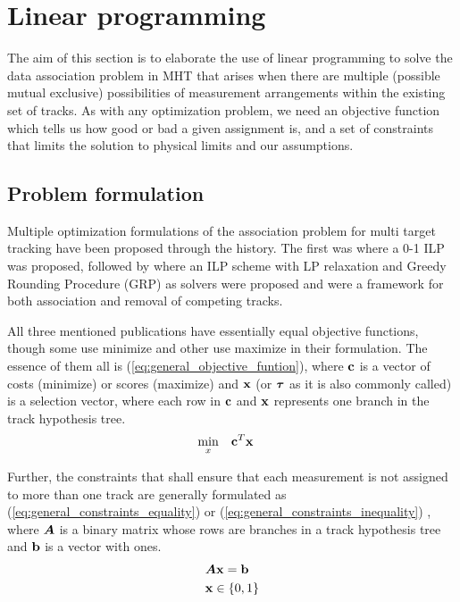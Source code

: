 \section{Linear programming}
\label{sec:ilp}
The aim of this section is to elaborate the use of linear programming to solve the data association problem in MHT that arises when there are multiple (possible mutual exclusive) possibilities of measurement arrangements within the existing set of tracks. As with any optimization problem, we need an objective function which tells us how good or bad a given assignment is, and a set of constraints that limits the solution to physical limits and our assumptions.

\subsection{Problem formulation}
Multiple optimization formulations of the association problem for multi target tracking have been proposed through the history. The first was \cite{Morefield1977} where a 0-1 ILP was proposed, followed by \cite{Storms2003} where an ILP scheme with LP relaxation and Greedy Rounding Procedure (GRP) as solvers were proposed and \cite{Coraluppi2004} were a framework for both association and removal of competing tracks.

All three mentioned publications have essentially equal objective functions, though some use minimize and other use maximize in their formulation. The essence of them all is (\ref{eq:general_objective_funtion}), where $\boldsymbol{\mathbf{c}}$ is a vector of costs (minimize) or scores (maximize) and $\boldsymbol{\mathbf{x}}$ (or $\boldsymbol{\mathbf{\tau}}$ as it is also commonly called) is a selection vector, where each row in $\boldsymbol{\mathbf{c}}$ and $\boldsymbol{\mathbf{x}}$ represents one branch in the track hypothesis tree.
\begin{equation}
\begin{aligned}
& \underset{x}{\text{min}}
& & \boldsymbol{\mathbf{c}}^T \boldsymbol{\mathbf{x}}
\end{aligned}
\label{eq:general_objective_funtion}
\end{equation}

Further, the constraints that shall ensure that each measurement is not assigned to more  than one track are generally formulated as (\ref{eq:general_constraints_equality}) or (\ref{eq:general_constraints_inequality}) , where $\bm{A}$ is a binary matrix whose rows are branches in a track hypothesis tree and $\boldsymbol{\mathbf{b}}$ is a vector with ones.
\begin{equation}
\begin{aligned}
&	\bm{A} \boldsymbol{\mathbf{x}} = \boldsymbol{\mathbf{b}} 	\\
&	\boldsymbol{\mathbf{x}} \in \{0,1\}
\end{aligned}
\label{eq:general_constraints_equality}
\end{equation}

